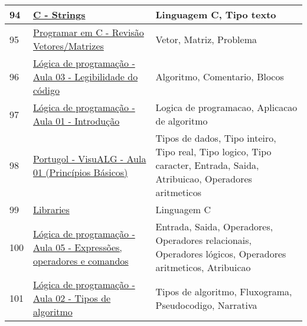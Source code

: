 \begin{longtable}{| p{} | p{} | p{} |}
94  & \href{https://www.tutorialspoint.com/cprogramming/c\_strings.htm}{C - Strings                                                                         } & Linguagem C, Tipo texto                                                                                                                           \\ \hline
95  & \href{https://www.youtube.com/watch?v=7oA8SBAOOAo}{Programar em C - Revisão Vetores/Matrizes                                           } & Vetor, Matriz, Problema                                                                                                                           \\ \hline
96  & \href{https://www.youtube.com/watch?v=7ph98Ih\_ckc}{Lógica de programação - Aula 03 - Legibilidade do código                            } & Algoritmo, Comentario, Blocos                                                                                                                     \\ \hline
97  & \href{https://www.youtube.com/watch?v=Ds1n6aHchRU}{Lógica de programação - Aula 01 - Introdução                                        } & Logica de programacao, Aplicacao de algoritmo                                                                                                     \\ \hline
98  & \href{https://www.youtube.com/watch?v=dZq7l9Oj-\_c}{Portugol - VisuALG - Aula 01 (Princípios Básicos)                                   } & Tipos de dados, Tipo inteiro, Tipo real, Tipo logico, Tipo caracter, Entrada, Saida, Atribuicao, Operadores aritmeticos                           \\ \hline
99  & \href{https://www.youtube.com/watch?v=ED7QtgXDShY}{Libraries                                                                           } & Linguagem C                                                                                                                                       \\ \hline
100 & \href{https://www.youtube.com/watch?v=g0iIVeeQo1M}{Lógica de programação - Aula 05 - Expressões, operadores e comandos                 } & Entrada, Saida, Operadores, Operadores relacionais, Operadores lógicos, Operadores aritmeticos, Atribuicao                                        \\ \hline
101 & \href{https://www.youtube.com/watch?v=JLlTo3SwxJE}{Lógica de programação - Aula 02 - Tipos de algoritmo                                } & Tipos de algoritmo, Fluxograma, Pseudocodigo, Narrativa                                                                                           \\ \hline

\end{longtable}
